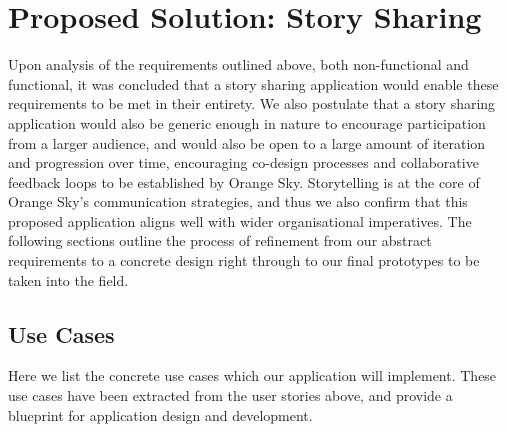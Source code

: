 \section{Proposed Solution: Story Sharing}

Upon analysis of the requirements outlined above, both non-functional and functional, it was concluded that a story sharing application would enable these requirements to be met in their entirety. We also postulate that a story sharing application would also be generic enough in nature to encourage participation from a larger audience, and would also be open to a large amount of iteration and progression over time, encouraging co-design processes and collaborative feedback loops to be established by Orange Sky. Storytelling is at the core of Orange Sky's communication strategies, and thus we also confirm that this proposed application aligns well with wider organisational imperatives. The following sections outline the process of refinement from our abstract requirements to a concrete design right through to our final prototypes to be taken into the field.

\subsection{Use Cases}

Here we list the concrete use cases which our application will implement. These use cases have been extracted from the user stories above, and provide a blueprint for application design and development.

